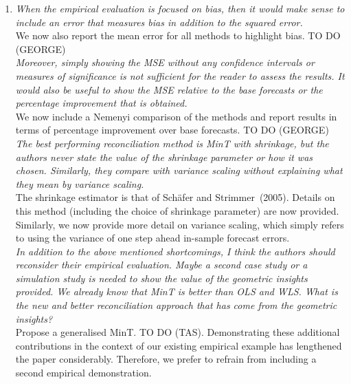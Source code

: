 \documentclass[a4paper,11pt]{article}
\begin{document}
	
	\begin{enumerate}
		
		
		
		\item \textit{When the empirical evaluation is focused on bias, then it would make sense to include an error that measures bias in addition to the squared error.}\\
		
		We now also report the mean error for all methods to highlight bias. TO DO (GEORGE)\\
		
		\textit{Moreover, simply showing the MSE without any confidence intervals or measures of significance is not sufficient for the reader to assess the results.  It would also be useful to show the MSE relative to the base forecasts or the percentage improvement that is obtained.} \\
		
		We now include a Nemenyi comparison of the methods and report results in terms of percentage improvement over base forecasts. TO DO (GEORGE)\\
	
	    \textit{The best performing reconciliation method is MinT with shrinkage, but the authors never state	the value of the shrinkage parameter or how it was chosen.  Similarly, they compare with variance scaling without explaining what they mean by variance scaling.}\\
	    
	    The shrinkage estimator is that of Sch\"afer and Strimmer~(2005). Details on this method (including the choice of shrinkage parameter) are now provided.  Similarly, we now provide more detail on variance scaling, which simply refers to using the variance of one step ahead in-sample forecast errors.\\
	    
	    \textit{In addition to the above mentioned shortcomings, I think the authors should reconsider their empirical evaluation. Maybe a second case study or a simulation study is needed to show the value of the geometric insights provided. We already know that MinT is better than OLS and WLS. What is the new and better reconciliation approach that has come from the geometric insights?}\\	
		
		Propose a generalised MinT. TO DO (TAS).  Demonstrating these additional contributions in the context of our existing empirical example has lengthened the paper considerably.  Therefore, we prefer to refrain from including a second empirical demonstration.\\
		

\end{enumerate}
\end{document}
